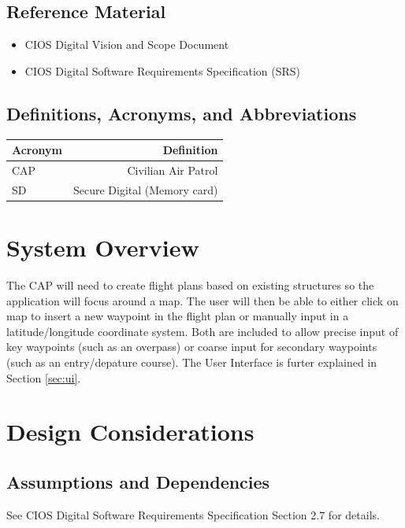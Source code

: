 \documentclass[12pt, letterpaper]{article}
\begin{document}
  \subsection{Reference Material}
    \begin{itemize}
      \setlength{\itemsep}{1pt}
      \setlength{\parskip}{0pt}
      \setlength{\parsep}{0pt}
      \item CIOS Digital Vision and Scope Document
      \item CIOS Digital Software Requirements Specification (SRS)
    \end{itemize}

  \subsection{Definitions, Acronyms, and Abbreviations}
  	\begin{tabularx}{\textwidth}{|l|R|} \hline
    	Acronym & Definition \\ \hline
    	CAP & Civilian Air Patrol  \\ \hline
    	SD & Secure Digital (Memory card) \\ \hline
  	\end{tabularx}

  \section{System Overview}\label{system}
    The CAP will need to create flight plans based on existing structures so the application will focus around a map.
    The user will then be able to either click on map to insert a new waypoint in the flight plan or manually input in a latitude/longitude coordinate system.
    Both are included to allow precise input of key waypoints (such as an overpass) or coarse input for secondary waypoints (such as an entry/depature course).
    The User Interface is furter explained in Section \ref{sec:ui}.


\section{Design Considerations} \label{dsign}
  \subsection{Assumptions and Dependencies}
    See CIOS Digital Software Requirements Specification Section 2.7 for details.
\end{document}
